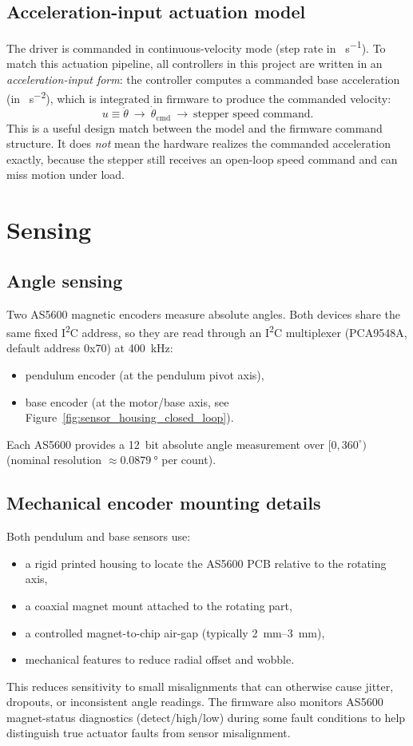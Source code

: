 \subsection*{Acceleration-input actuation model}
The driver is commanded in continuous-velocity mode (step rate in \si{\step\per\second}). To match this actuation pipeline, all controllers in this project are written in an \emph{acceleration-input form}: the controller computes a commanded base acceleration (in \si{\step\per\second\squared}), which is integrated in firmware to produce the commanded velocity:
\[
u \equiv \ddot{\theta} \ \longrightarrow\  \dot{\theta}_{\mathrm{cmd}} \ \longrightarrow\ \text{stepper speed command}.
\]
This is a useful design match between the model and the firmware command structure. It does \emph{not} mean the hardware realizes the commanded acceleration exactly, because the stepper still receives an open-loop speed command and can miss motion under load.

\section{Sensing}
\label{sec:sensing}
\subsection*{Angle sensing}
Two AS5600 magnetic encoders measure absolute angles. Both devices share the same fixed I\textsuperscript{2}C address, so they are read through an I\textsuperscript{2}C multiplexer (PCA9548A, default address 0x70) at \SI{400}{kHz}:
\begin{itemize}
  \item pendulum encoder (at the pendulum pivot axis),
  \item base encoder (at the motor/base axis, see Figure~\ref{fig:sensor_housing_closed_loop}).
\end{itemize}
Each AS5600 provides a \SI{12}{bit} absolute angle measurement over $[0,360^\circ)$ (nominal resolution $\approx \SI{0.0879}{\degree}$ per count).

\subsection*{Mechanical encoder mounting details}
Both pendulum and base sensors use:
\begin{itemize}
  \item a rigid printed housing to locate the AS5600 PCB relative to the rotating axis,
  \item a coaxial magnet mount attached to the rotating part,
  \item a controlled magnet-to-chip air-gap (typically \SIrange{2}{3}{mm}),
  \item mechanical features to reduce radial offset and wobble.
\end{itemize}
This reduces sensitivity to small misalignments that can otherwise cause jitter, dropouts, or inconsistent angle readings. The firmware also monitors AS5600 magnet-status diagnostics (detect/high/low) during some fault conditions to help distinguish true actuator faults from sensor misalignment.

